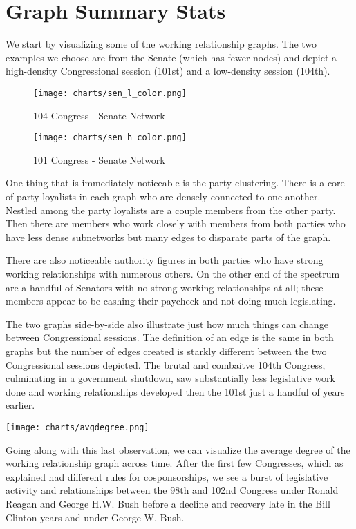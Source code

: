 \section{Graph Summary Stats}

We start by visualizing some of the working relationship graphs. The two examples we choose are from the Senate (which has fewer nodes) and depict a high-density Congressional session (101st) and a low-density session (104th).

\begin{figure}[htbp]
  \centering
  \begin{minipage}[h]{0.25\textwidth}
    \texttt{[image: charts/sen\_l\_color.png]}
    \caption*{104 Congress - Senate Network}
  \end{minipage}
  \hfill
  \begin{minipage}[h]{0.25\textwidth}
    \texttt{[image: charts/sen\_h\_color.png]}
    \caption*{101 Congress - Senate Network}
  \end{minipage}
\end{figure}

One thing that is immediately noticeable is the party clustering. There is a core of party loyalists in each graph who are densely connected to one another. Nestled among the party loyalists are a couple members from the other party. Then there are members who work closely with members from both parties who have less dense subnetworks but many edges to disparate parts of the graph. 

There are also noticeable authority figures in both parties who have strong working relationships with numerous others. On the other end of the spectrum are a handful of Senators with no strong working relationships at all; these members appear to be cashing their paycheck and not doing much legislating.

The two graphs side-by-side also illustrate just how much things can change between Congressional sessions. The definition of an edge is the same in both graphs but the number of edges created is starkly different between the two Congressional sessions depicted. The brutal and combaitve 104th Congress, culminating in a government shutdown, saw substantially less legislative work done and working relationships developed then the 101st just a handful of years earlier.

\texttt{[image: charts/avgdegree.png]}

Going along with this last observation, we can visualize the average degree of the working relationship graph across time. After the first few Congresses, which as explained had different rules for cosponsorships, we see a burst of legislative activity and relationships between the 98th and 102nd Congress under Ronald Reagan and George H.W. Bush before a decline and recovery late in the Bill Clinton years and under George W. Bush.

